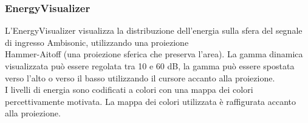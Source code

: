  \subsubsection*{EnergyVisualizer}

 L'EnergyVisualizer visualizza la distribuzione dell'energia sulla sfera del segnale di ingresso Ambisonic, utilizzando una proiezione \\Hammer-Aitoff (una proiezione sferica che preserva l'area).
 La gamma dinamica visualizzata può essere regolata tra 10 e 60 dB, la gamma può essere spostata verso l'alto o verso il basso utilizzando il cursore accanto alla proiezione. \\
 I livelli di energia sono codificati a colori con una mappa dei colori percettivamente motivata.
 La mappa dei colori utilizzata è raffigurata accanto alla proiezione. 

